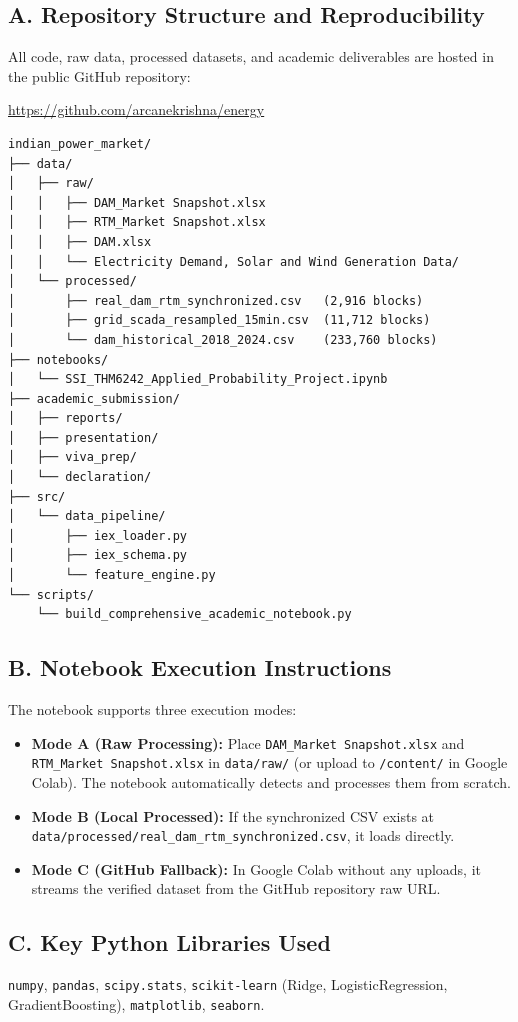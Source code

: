 \documentclass[12pt, a4paper]{article}
\theoremstyle{definition}
\begin{document}
\subsection*{A. Repository Structure and Reproducibility}

All code, raw data, processed datasets, and academic deliverables are hosted in the public GitHub repository:

\begin{center}
\url{https://github.com/arcanekrishna/energy}
\end{center}

\begin{verbatim}
indian_power_market/
├── data/
│   ├── raw/
│   │   ├── DAM_Market Snapshot.xlsx
│   │   ├── RTM_Market Snapshot.xlsx
│   │   ├── DAM.xlsx
│   │   └── Electricity Demand, Solar and Wind Generation Data/
│   └── processed/
│       ├── real_dam_rtm_synchronized.csv   (2,916 blocks)
│       ├── grid_scada_resampled_15min.csv  (11,712 blocks)
│       └── dam_historical_2018_2024.csv    (233,760 blocks)
├── notebooks/
│   └── SSI_THM6242_Applied_Probability_Project.ipynb
├── academic_submission/
│   ├── reports/
│   ├── presentation/
│   ├── viva_prep/
│   └── declaration/
├── src/
│   └── data_pipeline/
│       ├── iex_loader.py
│       ├── iex_schema.py
│       └── feature_engine.py
└── scripts/
    └── build_comprehensive_academic_notebook.py
\end{verbatim}

\subsection*{B. Notebook Execution Instructions}

The notebook supports three execution modes:
\begin{itemize}
    \item \textbf{Mode A (Raw Processing):} Place \texttt{DAM\_Market Snapshot.xlsx} and \texttt{RTM\_Market Snapshot.xlsx} in \texttt{data/raw/} (or upload to \texttt{/content/} in Google Colab). The notebook automatically detects and processes them from scratch.
    \item \textbf{Mode B (Local Processed):} If the synchronized CSV exists at \texttt{data/processed/real\_dam\_rtm\_synchronized.csv}, it loads directly.
    \item \textbf{Mode C (GitHub Fallback):} In Google Colab without any uploads, it streams the verified dataset from the GitHub repository raw URL.
\end{itemize}

\subsection*{C. Key Python Libraries Used}

\texttt{numpy}, \texttt{pandas}, \texttt{scipy.stats}, \texttt{scikit-learn} (Ridge, LogisticRegression, GradientBoosting), \texttt{matplotlib}, \texttt{seaborn}.
\end{document}

